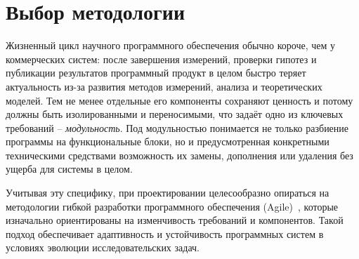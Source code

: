 \section{Выбор методологии}

%
Жизненный цикл научного программного обеспечения обычно короче, чем у коммерческих систем: после завершения измерений, проверки гипотез и публикации результатов программный продукт в целом быстро теряет актуальность из-за развития методов измерений, анализа и теоретических моделей. Тем не менее отдельные его компоненты сохраняют ценность и потому должны быть изолированными и переносимыми, что задаёт одно из ключевых требований -- \emph{модульность}. Под модульностью понимается не только разбиение программы на функциональные блоки, но и предусмотренная конкретными техническими средствами возможность их замены, дополнения или удаления без ущерба для системы в целом.

Учитывая эту специфику, при проектировании целесообразно опираться на методологии гибкой разработки программного обеспечения (Agile)~\cite{AgileManifesto2001}, которые изначально ориентированы на изменчивость требований и компонентов. Такой подход обеспечивает адаптивность и устойчивость программных систем в условиях эволюции исследовательских задач.


